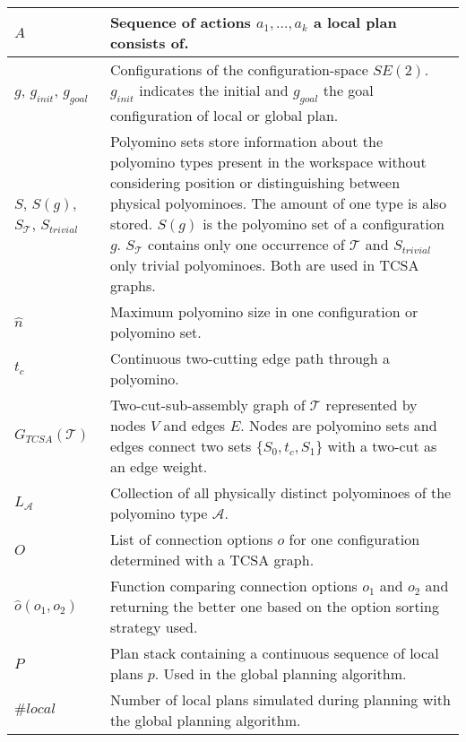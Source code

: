 \begin{xltabular}{\textwidth}{ l  X }
	$A$
	&
	Sequence of actions $a_1, ... , a_k$ a local plan consists of.
	\\ \midrule
		
	$g$, $g_\textit{init}$, $g_\textit{goal}$
	&
	Configurations of the configuration-space $\textit{SE}(2)$. $g_\textit{init}$ indicates the initial and $g_\textit{goal}$ the goal configuration of local or global plan.
	\\ \midrule
	
	$S$, $S(g)$, $S_\mathcal{T}$, $S_\textit{trivial}$
	&
	Polyomino sets store information about the polyomino types present in the workspace without considering position or distinguishing between physical polyominoes.
	The amount of one type is also stored.
	$S(g)$ is the polyomino set of a configuration $g$.
	$S_\mathcal{T}$ contains only one occurrence of $\mathcal{T}$ and $S_\textit{trivial}$ only trivial polyominoes.
	Both are used in TCSA graphs.
	\\ \midrule
	
	$\hat{n}$
	&
	Maximum polyomino size in one configuration or polyomino set.
	\\ \midrule
	
	$t_c$
	&
	Continuous two-cutting edge path through a polyomino.
	\\ \midrule
	
	$G_{\textit{TCSA}}(\mathcal{T})$
	&
	Two-cut-sub-assembly graph of $\mathcal{T}$ represented by nodes $V$ and edges $E$.
	Nodes are polyomino sets and edges connect two sets $\{S_0, t_c, S_1\}$ with a two-cut as an edge weight.
	\\ \midrule
	
	$L_\mathcal{A}$
	&
	Collection of all physically distinct polyominoes of the polyomino type $\mathcal{A}$.
	\\ \midrule
	
	$O$
	&
	List of connection options $o$ for one configuration determined with a TCSA graph.
	\\ \midrule
	
	$\hat{o}(o_1,o_2)$
	&
	Function comparing connection options $o_1$ and $o_2$ and returning the better one based on the option sorting strategy used.
	\\ \midrule
	
	$P$
	&
	Plan stack containing a continuous sequence of local plans $p$.
	Used in the global planning algorithm.
	\\ \midrule
	
	$\#\textit{local}$
	&
	Number of local plans simulated during planning with the global planning algorithm.
	\\ \midrule
	

\end{xltabular}
